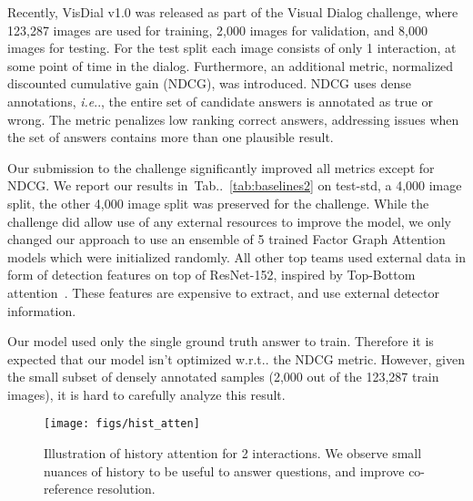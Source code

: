 \documentclass[10pt,twocolumn,letterpaper]{article}
\makeatletter
\def\@onedot{\ifx\@let@token.\else.\null\fi\xspace}
\DeclareRobustCommand\onedot{\futurelet\@let@token\@onedot}
\newcommand{\tabref}[1]{Tab\onedot~\ref{#1}}
\def\ie{\emph{i.e}\onedot} \def\Ie{\emph{I.e}\onedot}
\def\wrt{w.r.t\onedot} \def\dof{d.o.f\onedot}
\makeatother
\begin{document}
Recently, VisDial v1.0 was released as part of the  Visual Dialog challenge, where 123,287 images are used for training, 2,000 images for validation, and 8,000 images for testing.  For the test split each image consists of only 1 interaction, at some point of time in the dialog. Furthermore, an additional metric, normalized discounted cumulative gain (NDCG), was introduced. NDCG uses dense annotations, \ie, the entire set of candidate answers is annotated as true or wrong. The metric penalizes  low ranking  correct answers,  addressing issues when the set of answers contains more than one plausible result. 

Our submission to the challenge significantly improved all metrics except for NDCG. We report our results in~\tabref{tab:baselines2} on test-std, a 4,000 image split, the other 4,000 image split was preserved for the challenge. While the challenge did allow use of any external resources to improve the model, we only changed  our approach to use an  ensemble of 5 trained Factor Graph Attention models which were initialized randomly. All  other top teams used external data in form of detection features on top of ResNet-152, inspired by Top-Bottom attention~\cite{anderson2018bottom}. These features are  expensive to extract, and  use external detector information. 

Our model  used only the single ground truth answer to train. Therefore it is expected that our model isn't optimized \wrt the NDCG metric. However, given the small subset of densely annotated samples (2,000 out of the 123,287 train images), it is hard to carefully analyze this result. 
 



\begin{figure}
\vspace{-0.0cm}
	\centering
	\texttt{[image: figs/hist\_atten]}
	\vspace{-0.7cm}
	\caption{Illustration of history attention for 2 interactions. We observe small nuances of history to be useful to answer questions, and improve co-reference resolution.}
	\label{fig:coref}
	\vspace{-0.5cm}
\end{figure}
\end{document}
